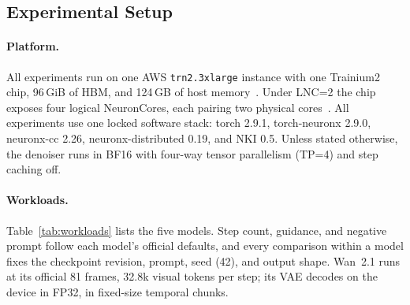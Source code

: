 \subsection{Experimental Setup}
\label{sec:eval-setup}

\paragraph{Platform.}
All experiments run on one AWS \texttt{trn2.3xlarge} instance with one Trainium2 chip, 96\,GiB of HBM, and 124\,GB of host memory~\cite{aws-trn2-instances}. Under LNC=2 the chip exposes four logical NeuronCores, each pairing two physical cores~\cite{aws-lnc}. All experiments use one locked software stack: torch 2.9.1, torch-neuronx 2.9.0, neuronx-cc 2.26, neuronx-distributed 0.19, and NKI 0.5. Unless stated otherwise, the denoiser runs in BF16 with four-way tensor parallelism (TP=4) and step caching off.

\paragraph{Workloads.}
Table~\ref{tab:workloads} lists the five models. Step count, guidance, and negative prompt follow each model's official defaults, and every comparison within a model fixes the checkpoint revision, prompt, seed (42), and output shape. Wan~2.1 runs at its official 81 frames, 32.8k visual tokens per step; its VAE decodes on the device in FP32, in fixed-size temporal chunks.


